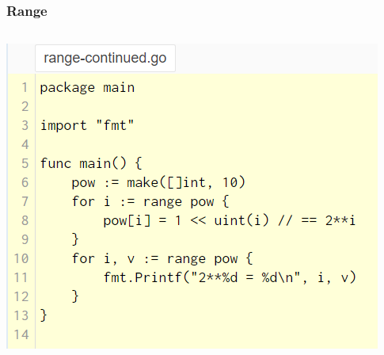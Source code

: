 \documentclass[14pt]{beamer}
\begin{document}
{
\begin{frame}
    \frametitle{Range}
    \begin{columns}
        \begin{column}{0.7\textwidth}
            \includegraphics[width=\linewidth]{img/range.PNG}
        \end{column}
        \begin{column}{0.3\textwidth}

\end{column}
\end{columns}
\end{frame}}
\end{document}
